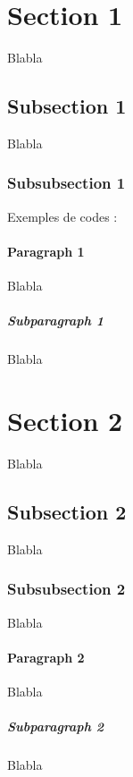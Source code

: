 \section{Section 1}
Blabla
\subsection{Subsection 1}
Blabla
\subsubsection{Subsubsection 1}
Exemples de codes :



\paragraph{Paragraph 1}
Blabla
\subparagraph{Subparagraph 1}
Blabla
\section{Section 2}
Blabla
\subsection{Subsection 2}
Blabla
\subsubsection{Subsubsection 2}
Blabla
\paragraph{Paragraph 2}
Blabla
\subparagraph{Subparagraph 2}
Blabla